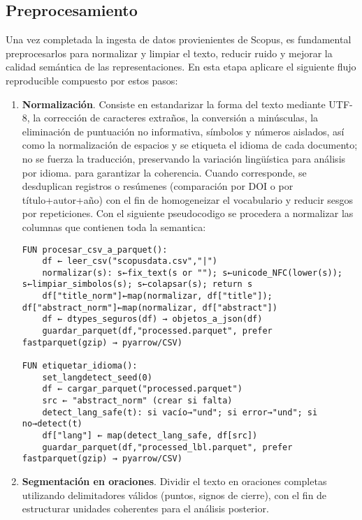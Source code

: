 \subsection{Preprocesamiento}
Una vez completada la ingesta de datos provienientes de Scopus, es fundamental preprocesarlos para normalizar y limpiar el texto, reducir ruido y mejorar la calidad semántica de las representaciones.
En esta etapa aplicare el siguiente flujo reproducible compuesto por estos pasos:
\begin{enumerate}
    \item \textbf{Normalización}. Consiste en estandarizar la forma del texto mediante 
    UTF-8, la corrección de caracteres extraños, la conversión a minúsculas, la eliminación de puntuación no informativa, 
    símbolos y números aislados, así como la normalización de espacios y se etiqueta el idioma de cada documento; no se fuerza la traducción, preservando la variación lingüística para análisis por idioma.
    para garantizar la coherencia. Cuando corresponde, se desduplican registros o resúmenes 
    (comparación por DOI o por título+autor+año) con el fin de homogeneizar el vocabulario y reducir sesgos por repeticiones.
Con el siguiente pseudocodigo se procedera a normalizar las columnas que contienen toda la semantica:
\begin{verbatim}
FUN procesar_csv_a_parquet():
    df ← leer_csv("scopusdata.csv","|")
    normalizar(s): s←fix_text(s or ""); s←unicode_NFC(lower(s)); s←limpiar_simbolos(s); s←colapsar(s); return s
    df["title_norm"]←map(normalizar, df["title"]); df["abstract_norm"]←map(normalizar, df["abstract"])
    df ← dtypes_seguros(df) → objetos_a_json(df)
    guardar_parquet(df,"processed.parquet", prefer fastparquet(gzip) → pyarrow/CSV)

FUN etiquetar_idioma():
    set_langdetect_seed(0)
    df ← cargar_parquet("processed.parquet")
    src ← "abstract_norm" (crear si falta)
    detect_lang_safe(t): si vacío→"und"; si error→"und"; si no→detect(t)
    df["lang"] ← map(detect_lang_safe, df[src])
    guardar_parquet(df,"processed_lbl.parquet", prefer fastparquet(gzip) → pyarrow/CSV)
\end{verbatim}

    \item \textbf{Segmentación en oraciones}. Dividir el texto en oraciones completas utilizando delimitadores válidos (puntos, signos de cierre), con el fin de 
    estructurar unidades coherentes para el análisis posterior. 


\end{enumerate}
